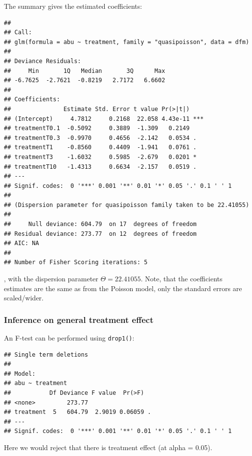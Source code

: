 The summary gives the estimated coefficients:
\begin{knitrout}
\color{fgcolor}\begin{kframe}
\begin{alltt}
\end{alltt}
\begin{verbatim}
## 
## Call:
## glm(formula = abu ~ treatment, family = "quasipoisson", data = dfm)
## 
## Deviance Residuals: 
##     Min       1Q   Median       3Q      Max  
## -6.7625  -2.7621  -0.8219   2.7172   6.6602  
## 
## Coefficients:
##               Estimate Std. Error t value Pr(>|t|)    
## (Intercept)     4.7812     0.2168  22.058 4.43e-11 ***
## treatmentT0.1  -0.5092     0.3889  -1.309   0.2149    
## treatmentT0.3  -0.9970     0.4656  -2.142   0.0534 .  
## treatmentT1    -0.8560     0.4409  -1.941   0.0761 .  
## treatmentT3    -1.6032     0.5985  -2.679   0.0201 *  
## treatmentT10   -1.4313     0.6634  -2.157   0.0519 .  
## ---
## Signif. codes:  0 '***' 0.001 '**' 0.01 '*' 0.05 '.' 0.1 ' ' 1
## 
## (Dispersion parameter for quasipoisson family taken to be 22.41055)
## 
##     Null deviance: 604.79  on 17  degrees of freedom
## Residual deviance: 273.77  on 12  degrees of freedom
## AIC: NA
## 
## Number of Fisher Scoring iterations: 5
\end{verbatim}
\end{kframe}
\end{knitrout}

, with the dispersion parameter $\Theta = 22.41055$. 
Note, that the coefficients estimates are the same as from the Poisson model, only the standard errors are scaled/wider.

\subsubsection{Inference on general treatment effect}
An F-test can be performed using \texttt{drop1()}:
\begin{knitrout}
\color{fgcolor}\begin{kframe}
\begin{alltt}
  \hlstd{=} \hlstd{)}
\end{alltt}
\begin{verbatim}
## Single term deletions
## 
## Model:
## abu ~ treatment
##           Df Deviance F value  Pr(>F)  
## <none>         273.77                  
## treatment  5   604.79  2.9019 0.06059 .
## ---
## Signif. codes:  0 '***' 0.001 '**' 0.01 '*' 0.05 '.' 0.1 ' ' 1
\end{verbatim}
\end{kframe}
\end{knitrout}
Here we would reject that there is treatment effect (at alpha = 0.05).

